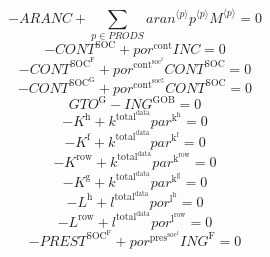 \begin{equation}
-{A\!R\!A\!N\!C} + \sum_{p\in {P\!R\!O\!D\!S}} {{{a\!r\!a\!n}}^{\langle p\rangle}} {{p}^{\langle p\rangle}} {{M}^{\langle p\rangle}} = 0
\end{equation}
\begin{equation}
-{C\!O\!N\!T}^{\mathrm{SOC}} + {{p\!o\!r}^{\mathrm{cont}}} {{I\!N\!C}} = 0
\end{equation}
\begin{equation}
-{C\!O\!N\!T}^{\mathrm{SOC}^{\mathrm{F}}} + {{p\!o\!r}^{\mathrm{cont}^{\mathrm{soc}^{\mathrm{f}}}}} {{C\!O\!N\!T}^{\mathrm{SOC}}} = 0
\end{equation}
\begin{equation}
-{C\!O\!N\!T}^{\mathrm{SOC}^{\mathrm{G}}} + {{p\!o\!r}^{\mathrm{cont}^{\mathrm{soc}^{\mathrm{g}}}}} {{C\!O\!N\!T}^{\mathrm{SOC}}} = 0
\end{equation}
\begin{equation}
{G\!T\!O}^{\mathrm{G}} - {I\!N\!G}^{\mathrm{GOB}} = 0
\end{equation}
\begin{equation}
-K^{\mathrm{h}} + {k^{\mathrm{total}^{\mathrm{data}}}} {{p\!a\!r}^{\mathrm{k}^{\mathrm{h}}}} = 0
\end{equation}
\begin{equation}
-K^{\mathrm{f}} + {k^{\mathrm{total}^{\mathrm{data}}}} {{p\!a\!r}^{\mathrm{k}^{\mathrm{f}}}} = 0
\end{equation}
\begin{equation}
-K^{\mathrm{row}} + {k^{\mathrm{total}^{\mathrm{data}}}} {{p\!a\!r}^{\mathrm{k}^{\mathrm{row}}}} = 0
\end{equation}
\begin{equation}
-K^{\mathrm{g}} + {k^{\mathrm{total}^{\mathrm{data}}}} {{p\!a\!r}^{\mathrm{k}^{\mathrm{g}}}} = 0
\end{equation}
\begin{equation}
-L^{\mathrm{h}} + {l^{\mathrm{total}^{\mathrm{data}}}} {{p\!o\!r}^{\mathrm{l}^{\mathrm{h}}}} = 0
\end{equation}
\begin{equation}
-L^{\mathrm{row}} + {l^{\mathrm{total}^{\mathrm{data}}}} {{p\!o\!r}^{\mathrm{l}^{\mathrm{row}}}} = 0
\end{equation}
\begin{equation}
-{P\!R\!E\!S\!T}^{\mathrm{SOC}^{\mathrm{F}}} + {{p\!o\!r}^{\mathrm{pres}^{\mathrm{soc}^{\mathrm{f}}}}} {{I\!N\!G}^{\mathrm{F}}} = 0
\end{equation}
